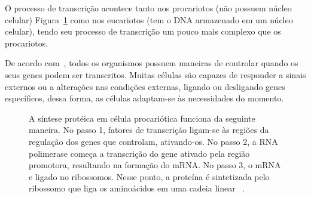 O processo de transcrição acontece tanto nos procariotos (não possuem núcleo celular) Figura~\ref{fig:processo-sintese-proteinaProc} como nos eucariotos (tem o DNA armazenado em um núcleo celular), tendo seu processo de transcrição um pouco mais complexo que os procariotos.

De acordo com~\citep{lodish:2005}, todos os organismos possuem maneiras de controlar quando os seus genes podem ser transcritos. Muitas células são capazes de responder a sinais externos ou a alterações nas condições externas, ligando ou desligando genes específicos, dessa forma, as células adaptam-se às necessidades do momento.

\begin{figure} [htb!]
\centering
{}
\caption{A síntese protéica em célula procariótica funciona da seguinte maneira. No passo 1, fatores de transcrição ligam-se às regiões da regulação dos genes que controlam, ativando-os. No passo 2, a RNA polimerase começa a transcrição do gene ativado pela região promotora, resultando na formação do mRNA. No passo 3, o mRNA e ligado no ribossomos. Nesse ponto, a proteína é sintetizada pelo ribossomo que liga os aminoácidos em uma cadeia linear ~\citep{lodish:2005}. \label{fig:processo-sintese-proteinaProc}}
\end{figure}

